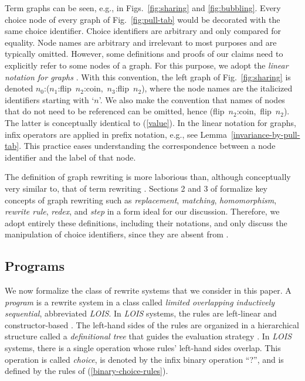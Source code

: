 \documentclass{mytlp}
\renewcommand{\tt}{\usefont{OT1}{cmtt}{m}{n}\selectfont}
\newcommand{\code}[1]{\mbox{\tt #1}}   \newcommand{\bs}{\char92} \newcommand{\us}{\char95}
\begin{document}
Term graphs can be seen, e.g.,
in Figs.~\ref{fig:sharing} and \ref{fig:bubbling}.
Every choice node of every graph of Fig.~\ref{fig:pull-tab}
would be decorated with the same choice identifier.
Choice identifiers are arbitrary and only compared for equality.
Node names are arbitrary and irrelevant to most purposes
and are typically omitted.
However, some definitions and proofs of our claims need to
explicitly refer to some nodes of a graph.
For this purpose, we adopt the \emph{linear notation for graphs}
\cite[Def.~4]{EchahedJanodet97IMAG}.
With this convention, the left graph of Fig.~\ref{fig:sharing}
is denoted \code{$n_0$:($n_1$:flip\ $n_2$:coin,\ $n_3$:flip\ $n_2$)},
where the node names are the italicized identifiers starting with `$n$'.
We also make the convention that names of nodes that do not need to be
referenced can be omitted, hence \code{(flip\ $n_2$:coin,\ flip\ $n_2$)}.
The latter is conceptually identical to (\ref{value}).
In the linear notation for graphs, infix operators are
applied in prefix notation, e.g., see Lemma~\ref{invariance-by-pull-tab}.
This practice eases understanding the correspondence between
a node identifier and the label of that node.

The definition of graph rewriting
\cite{EchahedJanodet97IMAG,Plump99Handbook}
is more laborious than, although conceptually very similar to,
that of term rewriting
\cite{BaaderNipkow98,Terese03,DershowitzJouannaud90handbook,Klop92Handbook}.
Sections 2 and 3 of \cite{EchahedJanodet97IMAG} 
formalize key concepts of graph rewriting such as
\emph{replacement}, \emph{matching}, \emph{homomorphism},
\emph{rewrite rule}, \emph{redex}, and \emph{step}
in a form ideal for our discussion.
Therefore, we adopt entirely these definitions, including their notations,
and only discuss the manipulation of choice identifiers,
since they are absent from \cite{EchahedJanodet97IMAG}.



\subsection{Programs}

We now formalize the class of rewrite systems that we consider
in this paper.
A \emph{program} is a rewrite system in a class
called \emph{limited overlapping inductively sequential},
abbreviated \emph{LOIS}.
In \emph{LOIS} systems, the rules
are left-linear and constructor-based \cite{Odonnell85Book}.
The left-hand sides of the rules are organized
in a hierarchical structure called a 
\emph{definitional tree} \cite{Antoy92ALP}
that guides the evaluation strategy \cite{Antoy05JSC}.
In \emph{LOIS} systems, there is a single
operation whose rules' left-hand sides overlap.
This operation is called \emph{choice},
is denoted by the infix binary operation ``\code{?}'',
and is defined by the rules of (\ref{binary-choice-rules}).
\end{document}

